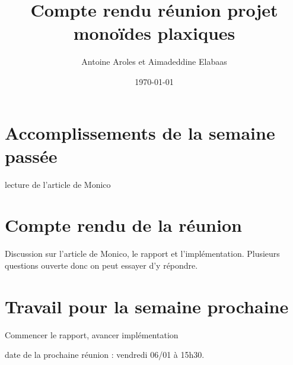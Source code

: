 \documentclass[a4paper,12pt]{article}
\title{Compte rendu réunion projet monoïdes plaxiques}  %
\author{Antoine Aroles et Aimadeddine Elabaas}
\date{\today}  %
\begin{document}
\maketitle
\section{Accomplissements de la semaine passée}
lecture de l'article de Monico
\section{Compte rendu de la réunion}
Discussion sur l'article de Monico, le rapport et l'implémentation. Plusieurs questions ouverte donc on peut essayer d'y répondre.
\section{Travail pour la semaine prochaine}
Commencer le rapport, avancer implémentation

\noindent
date de la prochaine réunion : vendredi 06/01 à 15h30.
\end{document}
